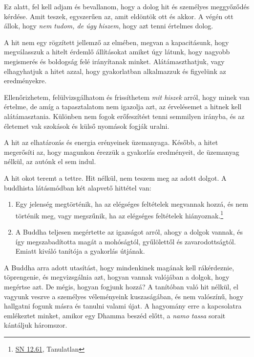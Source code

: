 Ez alatt, fel kell adjam és bevallanom, hogy a dolog hit és személyes
meggyőződés kérdése. Amit teszek, egyszerűen az, amit eldöntök ott és
akkor. A végén ott állok, hogy \emph{nem tudom, de úgy hiszem}, hogy azt
tenni értelmes dolog.

A hit nem egy rögzített jellemző az elmében, megvan a kapacitásunk, hogy
megválasszuk a hitelt érdemlő állításokat amiket úgy látunk, hogy
nagyobb megismerés és boldogság felé irányítanak minket.
Alátámaszthatjuk, vagy elhagyhatjuk a hitet azzal, hogy gyakorlatban
alkalmazzuk és figyelünk az eredményekre.

\clearpage

Ellenőrizhetem, felülvizsgálhatom és frissíthetem \emph{mit hiszek}
arról, hogy minek van értelme, de amíg a tapasztalatom nem igazolja azt,
az érvelésemet a hitnek kell alátámasztania. Különben nem fogok
erőfeszítést tenni semmilyen irányba, és az életemet vak szokások és
külső nyomások fogják uralni.

A hit az elhatározás és energia erényeinek üzemanyaga. Később, a hitet
megerősíti az, hogy magunkon érezzük a gyakorlás eredményeit, de
üzemanyag nélkül, az autónk el sem indul.


A hit okot teremt a tettre. Hit nélkül, nem teszem meg az adott dolgot.
A buddhista látásmódban két alapvető hittétel van:

\begin{enumerate}
\item
  Egy jelenség megtörténik, ha az elégséges feltételek megvannak hozzá,
  és nem történik meg, vagy megszűnik, ha az elégséges feltételek
  hiányoznak.\footnote{\href{https://www.dhammatalks.org/suttas/SN/SN12_61.html}{SN
    12.61}, Tanulatlan}
\item
  A Buddha teljesen megértette az igazságot arról, ahogy a dolgok
  vannak, és így megszabadította magát a mohóságtól, gyűlölettől és
  zavarodottságtól. Emiatt kiváló tanítója a gyakorlás útjának.
\end{enumerate}

A Buddha arra adott utasítást, hogy mindenkinek magának kell
rákérdeznie, töprengenie, és megvizsgálnia azt, hogyan vannak valójában
a dolgok, hogy megértse azt. De mégis, hogyan fogjunk hozzá? A tanítóban
való hit nélkül, el vagyunk veszve a személyes véleményeink
kuszaságában, és nem valószínű, hogy hallgatni fogunk másra és tanulni
valami újat. A hagyomány erre a kapcsolatra emlékeztet minket, amikor
egy Dhamma beszéd előtt, a \emph{namo tassa} sorait kántáljuk háromszor.


